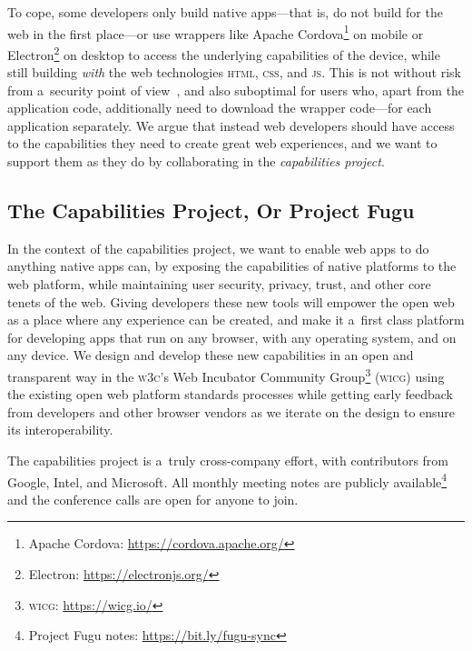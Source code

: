 \documentclass[sigconf, anonymous]{acmart}
\begin{document}
To cope, some developers only build native apps---that is,
do not build for the web in the first place---or
use wrappers like Apache Cordova\footnote{Apache Cordova: \url{https://cordova.apache.org/}}
on mobile or Electron\footnote{Electron: \url{https://electronjs.org/}} on desktop
to access the underlying capabilities of the device,
while still building \textit{with} the web technologies
\textsc{html}, \textsc{css}, and \textsc{js}.
This is not without risk from a~security point of view~\cite{carettoni17,luo11},
and also suboptimal for users who, apart from the application code,
additionally need to download the wrapper code---for each application separately.
We argue that instead web developers should have access
to the capabilities they need to create great web experiences,
and we want to support them as they do by collaborating in the \textit{capabilities project}.

\subsection{The Capabilities Project, Or Project Fugu}

In the context of the capabilities project, we want to enable web apps
to do anything native apps can, by exposing the capabilities of native platforms
to the web platform, while maintaining user security, privacy, trust,
and other core tenets of the web.
Giving developers these new tools will empower the open web
as a place where any experience can be created,
and make it a~first class platform for developing apps that run on any browser,
with any operating system, and on any device.
We design and develop these new capabilities in an open and transparent way
in the \textsc{w3c}'s Web Incubator Community
Group\footnote{\textsc{wicg}: \url{https://wicg.io/}} (\textsc{wicg})
using the existing open web platform standards processes
while getting early feedback from developers and other browser vendors
as we iterate on the design to ensure its interoperability.

The capabilities project is a~truly cross-company effort,
with contributors from Google, Intel, and Microsoft.
All monthly meeting notes are publicly
available\footnote{Project Fugu notes: \url{https://bit.ly/fugu-sync}}
and the conference calls are open for anyone to join.
\end{document}
